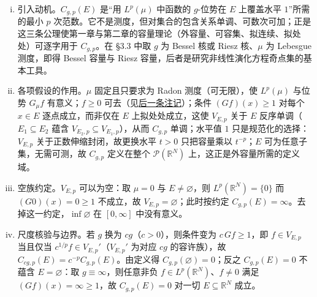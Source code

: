 \documentclass[../../main.tex]{subfiles}%
\begin{document}
\begin{remark}\label{remark:ch03-Cgp动机}
\begin{enumerate}[(i)]
\item 引入动机。$C_{g,p}(E)$ 是“用 $L^p(\mu)$ 中函数的 $g$-位势在 $E$ 上覆盖水平 $1$”所需的最小 $p$ 次范数。它不是测度，但对集合的包含关系单调、可数次可加；正是这三条公理使第一章与第二章的容量理论（外容量、可容集、拟连续、拟处处）可逐字用于 $C_{g,p}$。在 \S3.3 中取 $g$ 为 Bessel 核或 Riesz 核、$\mu$ 为 Lebesgue 测度，即得 Bessel 容量与 Riesz 容量，后者是研究非线性演化方程奇点集的基本工具。

\item 各项假设的作用。$\mu$ 固定且只要求为 Radon 测度（可无限），使 $L^p(\mu)$ 与位势 $G_\mu f$ 有意义；$f\geqslant0$ 可去（见\hyperref[remark:ch03-非负可去]{后一条注记}）；条件 $(Gf)(x)\geqslant1$ 对每个 $x\in E$ 逐点成立，而非仅在 $E$ 上拟处处成立，这使 $V_{E,p}$ 关于 $E$ 反序单调（$E_1\subseteq E_2$ 蕴含 $V_{E_2,p}\subseteq V_{E_1,p}$），从而 $C_{g,p}$ 单调；水平值 $1$ 只是规范化的选择：$V_{E,p}$ 关于正数伸缩封闭，故更换水平 $t>0$ 只把容量乘以 $t^{-p}$；$E$ 可为任意子集，无需可测，故 $C_{g,p}$ 定义在整个 $\mathcal{P}(\mathbb{R}^N)$ 上，这正是外容量所需的定义域。

\item 空族约定。$V_{E,p}$ 可以为空：取 $\mu=0$ 与 $E\neq\varnothing$，则 $L^p(\mathbb{R}^N)=\{0\}$ 而 $(G0)(x)=0\geqslant1$ 不成立，故 $V_{E,p}=\varnothing$；此时按约定 $C_{g,p}(E)=\infty$。去掉这一约定，$\inf\varnothing$ 在 $[0,\infty]$ 中没有意义。

\item 尺度核验与边界。若 $g$ 换为 $cg$（$c>0$），则条件变为 $c\,Gf\geqslant1$，即 $f\in V_{E,p}$ 当且仅当 $c^{1/p}f\in V_{E,p}'$（$V_{E,p}'$ 为对应 $cg$ 的容许族），故 $C_{cg,p}(E)=c^{-p}C_{g,p}(E)$。由定义得 $C_{g,p}(\varnothing)=0$；反之 $C_{g,p}(E)=0$ 不蕴含 $E=\varnothing$：取 $g\equiv\infty$，则任意非负 $f\in L^p(\mathbb{R}^N)$、$f\neq0$ 满足 $(Gf)(x)=\infty\geqslant1$，故 $C_{g,p}(E)=0$ 对一切 $E\subseteq\mathbb{R}^N$ 成立。
\end{enumerate}
\end{remark}
\end{document}
